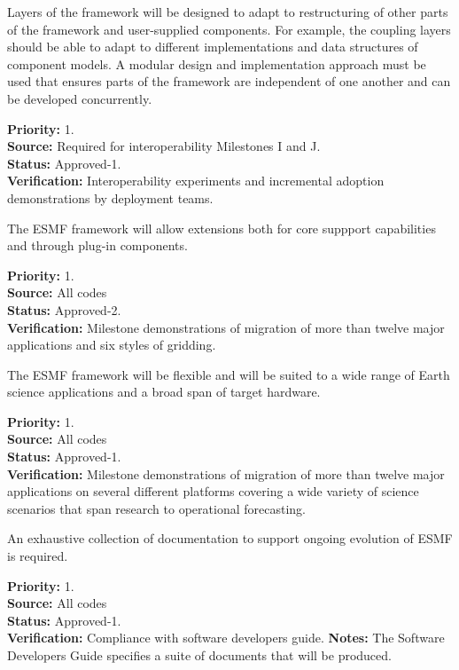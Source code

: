 Layers of the framework will be designed to adapt to restructuring of
other parts of the framework and user-supplied components.  For
example, the coupling layers should be able to adapt to different
implementations and data structures of component models.
A modular design and implementation approach must be used that ensures
parts of the framework are independent of one another and can be 
developed concurrently.
\begin{reqlist}
{\bf Priority:} 1. \\
{\bf Source:} Required for interoperability Milestones I and J. \\
{\bf Status:} Approved-1. \\
{\bf Verification:} Interoperability experiments and incremental
adoption demonstrations by deployment teams.
\end{reqlist}

 The ESMF framework will allow extensions both
for core suppport capabilities and through plug-in components.
\begin{reqlist}
{\bf Priority:} 1. \\
{\bf Source:} All codes\\
{\bf Status:} Approved-2. \\
{\bf Verification:} Milestone demonstrations of migration
of more than twelve major applications and six styles of gridding.
\end{reqlist}

 The ESMF framework will be flexible and will
be suited to a wide range of Earth science applications and a broad span
of target hardware.
\begin{reqlist}
{\bf Priority:} 1. \\
{\bf Source:} All codes\\
{\bf Status:} Approved-1. \\
{\bf Verification:} Milestone demonstrations of migration
of more than twelve major applications on several different
platforms covering a wide variety of science scenarios
that span research to operational forecasting.
\end{reqlist}

 An exhaustive collection of documentation
to support ongoing evolution of ESMF is required.
\begin{reqlist}
{\bf Priority:} 1. \\
{\bf Source:} All codes\\
{\bf Status:} Approved-1. \\
{\bf Verification:} Compliance with software developers guide.
{\bf Notes:} The Software Developers Guide specifies a suite of documents 
that will be produced.
\end{reqlist}

